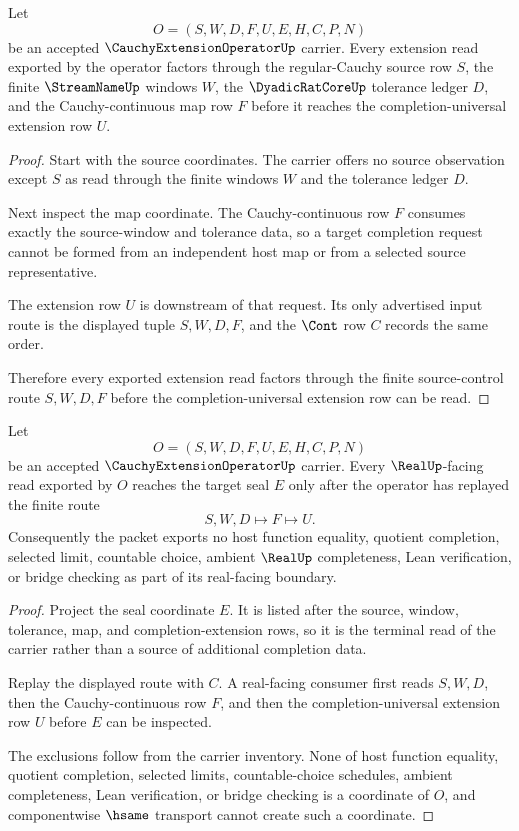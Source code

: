 \begin{theorem}
\label{thm:cauchy-extension-operator-source-control}
Let
$$
O=(S,W,D,F,U,E,H,C,P,N)
$$
be an accepted $\CauchyExtensionOperatorUp$ carrier. Every extension read exported by the operator factors through the regular-Cauchy source row $S$, the finite $\StreamNameUp$ windows $W$, the $\DyadicRatCoreUp$ tolerance ledger $D$, and the Cauchy-continuous map row $F$ before it reaches the completion-universal extension row $U$.
\end{theorem}
\begin{proof}
Start with the source coordinates. The carrier offers no source observation except $S$ as read through the finite windows $W$ and the tolerance ledger $D$.

Next inspect the map coordinate. The Cauchy-continuous row $F$ consumes exactly the source-window and tolerance data, so a target completion request cannot be formed from an independent host map or from a selected source representative.

The extension row $U$ is downstream of that request. Its only advertised input route is the displayed tuple $S,W,D,F$, and the $\Cont$ row $C$ records the same order.

Therefore every exported extension read factors through the finite source-control route $S,W,D,F$ before the completion-universal extension row can be read.
\end{proof}

\begin{theorem}
\label{thm:cauchy-extension-operator-real-seal-boundary}
Let
$$
O=(S,W,D,F,U,E,H,C,P,N)
$$
be an accepted $\CauchyExtensionOperatorUp$ carrier. Every $\RealUp$-facing read exported by $O$ reaches the target seal $E$ only after the operator has replayed the finite route
$$
S,W,D\longmapsto F\longmapsto U.
$$
Consequently the packet exports no host function equality, quotient completion, selected limit, countable choice, ambient $\RealUp$ completeness, Lean verification, or bridge checking as part of its real-facing boundary.
\end{theorem}
\begin{proof}
Project the seal coordinate $E$. It is listed after the source, window, tolerance, map, and completion-extension rows, so it is the terminal read of the carrier rather than a source of additional completion data.

Replay the displayed route with $C$. A real-facing consumer first reads $S,W,D$, then the Cauchy-continuous row $F$, and then the completion-universal extension row $U$ before $E$ can be inspected.

The exclusions follow from the carrier inventory. None of host function equality, quotient completion, selected limits, countable-choice schedules, ambient completeness, Lean verification, or bridge checking is a coordinate of $O$, and componentwise $\hsame$ transport cannot create such a coordinate.
\end{proof}

